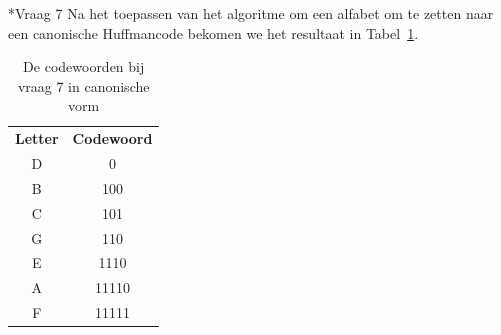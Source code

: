 \documentclass[]{article}
\begin{document}
\begin{section}
    \begin{subsection}*{Vraag 7}
        Na het toepassen van het algoritme om een alfabet om te zetten
        naar een canonische Huffmancode bekomen we het resultaat in
        Tabel~\ref{tab:canonical_codes}.

        \begin{table}
            \centering
            \begin{tabular}{c|c}
            \textbf{Letter} &
            \textbf{Codewoord} \\
            D & 0 \\
            B & 100 \\
            C & 101 \\
            G & 110 \\
            E & 1110 \\
            A & 11110 \\
            F & 11111 \\
            \end{tabular}
            \caption{De codewoorden bij vraag 7 in canonische vorm}
            \label{tab:canonical_codes}
        \end{table}

    \end{subsection}

\end{section}
\end{document}
